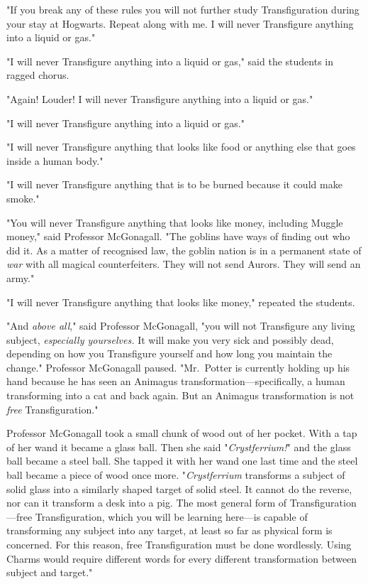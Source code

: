"If you break any of these rules you will not further study Transfiguration 
during your stay at Hogwarts. Repeat along with me. I will never Transfigure 
anything into a liquid or gas."

"I will never Transfigure anything into a liquid or gas," said the students in 
ragged chorus.

"Again! Louder! I will never Transfigure anything into a liquid or gas."

"I will never Transfigure anything into a liquid or gas."

"I will never Transfigure anything that looks like food or anything else that 
goes inside a human body."

"I will never Transfigure anything that is to be burned because it could make 
smoke."

"You will never Transfigure anything that looks like money, including Muggle 
money," said Professor McGonagall. "The goblins have ways of finding out who 
did it. As a matter of recognised law, the goblin nation is in a permanent 
state of \emph{war} with all magical counterfeiters. They will not send Aurors. 
They will send an army."

"I will never Transfigure anything that looks like money," repeated the 
students.

"And \emph{above all}," said Professor McGonagall, "you will not Transfigure 
any living subject, \emph{especially yourselves.} It will make you very sick 
and possibly dead, depending on how you Transfigure yourself and how long you 
maintain the change." Professor McGonagall paused. "Mr.~Potter is currently 
holding up his hand because he has seen an Animagus 
transformation---specifically, a human transforming into a cat and back again. 
But an Animagus transformation is not \emph{free} Transfiguration."

Professor McGonagall took a small chunk of wood out of her pocket. With a tap 
of her wand it became a glass ball. Then she said "\emph{Crystferrium!}" and 
the glass ball became a steel ball. She tapped it with her wand one last time 
and the steel ball became a piece of wood once more. "\emph{Crystferrium} 
transforms a subject of solid glass into a similarly shaped target of solid 
steel. It cannot do the reverse, nor can it transform a desk into a pig. The 
most general form of Transfiguration---free Transfiguration, which you will be 
learning here---is capable of transforming any subject into any target, at 
least so far as physical form is concerned. For this reason, free 
Transfiguration must be done wordlessly. Using Charms would require different 
words for every different transformation between subject and target."

